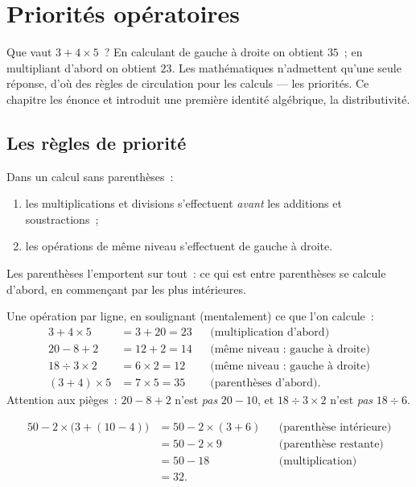 \chapter{Priorités opératoires}\label{ch:g7:priorities}

Que vaut $3 + 4 \times 5$~? En calculant de gauche à droite on
obtient $35$~; en multipliant d'abord on obtient $23$. Les
mathématiques n'admettent qu'une seule réponse, d'où des règles de
circulation pour les calculs --- les priorités. Ce chapitre les
énonce et introduit une première identité algébrique, la
distributivité.

\section{Les règles de priorité}

\begin{theorem}\label{thm:g7:priorities:rules}
Dans un calcul sans parenthèses~:
\begin{enumerate}
  \item les multiplications et divisions s'effectuent \emph{avant}
        les additions et soustractions~;
  \item les opérations de même niveau s'effectuent de gauche à
        droite.
\end{enumerate}
Les parenthèses l'emportent sur tout~: ce qui est entre parenthèses
se calcule d'abord, en commençant par les plus intérieures.
\end{theorem}

\begin{example}\label{ex:g7:priorities:basic}
Une opération par ligne, en soulignant (mentalement) ce que l'on
calcule~:
\begin{align*}
3 + 4 \times 5 &= 3 + 20 = 23
&&\text{(multiplication d'abord)}\\
20 - 8 + 2 &= 12 + 2 = 14
&&\text{(même niveau~: gauche à droite)}\\
18 \div 3 \times 2 &= 6 \times 2 = 12
&&\text{(même niveau~: gauche à droite)}\\
(3 + 4) \times 5 &= 7 \times 5 = 35
&&\text{(parenthèses d'abord).}
\end{align*}
Attention aux pièges~: $20 - 8 + 2$ n'est \emph{pas} $20 - 10$, et
$18 \div 3 \times 2$ n'est \emph{pas} $18 \div 6$.
\end{example}

\begin{example}\label{ex:g7:priorities:nested}
\begin{align*}
50 - 2 \times \bigl(3 + (10 - 4)\bigr)
&= 50 - 2 \times (3 + 6) && \text{(parenthèse intérieure)}\\
&= 50 - 2 \times 9 && \text{(parenthèse restante)}\\
&= 50 - 18 && \text{(multiplication)}\\
&= 32 .
\end{align*}
\end{example}

